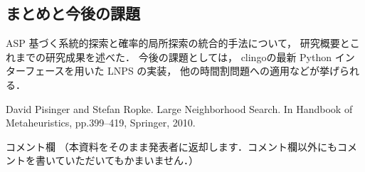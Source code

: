 \documentclass[a4j,10pt]{jarticle}
\begin{document}
\begin{multicols}{1}
\section{まとめと今後の課題}
ASP 基づく系統的探索と確率的局所探索の統合的手法について，
研究概要とこれまでの研究成果を述べた．
今後の課題としては，
\textsf{clingo}の最新 Python インターフェースを用いた LNPS の実装，
他の時間割問題への適用などが挙げられる．

\begin{thebibliography}{10}
David Pisinger and Stefan Ropke. 
Large Neighborhood Search. 
In Handbook of Metaheuristics,
pp.399--419, Springer, 2010.
\end{thebibliography}

\end{multicols}
\vfill
\noindent
{\gt コメント欄}
{\footnotesize
（本資料をそのまま発表者に返却します．コメント欄以外にもコメントを書いていただいてもかまいません．）}
\\
\fbox{\begin{minipage}{\textwidth}\noindent\\\\\end{minipage}}	
\end{document}
